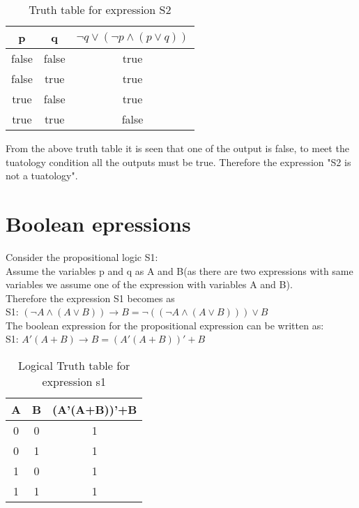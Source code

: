 \documentclass[journal,12pt,twocolumn]{IEEEtran}
\begin{document}
\begin{table}[h]
  \centering
  \caption{Truth table for expression S2}
   \begin{tabular}{|c|c|c|}
\hline
p & q & $\neg{q} \lor (\neg{p} \land ({p}\lor {q}))$\\
\hline
false & false & true\\
\hline
false & true & true\\
\hline                   
true & false & true\\
\hline
true & true & false\\   
\hline
\end{tabular}
\end{table}
    From the above truth table it is seen that one of the output is false, to meet the tuatology condition all the outputs must be true. Therefore the expression "S2 is not a tuatology".\\
\section{Boolean epressions}
 Consider the propositional logic S1:\\
  Assume the variables p and q as A and B(as there are two expressions with same variables we assume one of the expression with variables A and B).\\
Therefore the expression S1 becomes as\\
S1: $(\neg{A} \land({A}\lor{B})) \longrightarrow B = \neg((\neg{A} \land({A}\lor{B})))\lor{B}$\\
The boolean expression for the propositional expression can be written as:\\
S1: $A'(A+B) \longrightarrow B = (A'(A+B))'+B$
\begin{table}[h]
	\centering
	\caption{Logical Truth table for expression s1}
	\begin{tabular}{|c|c|c|}
	\hline
	A & B & (A'(A+B))'+B\\
	\hline
	0 & 0 & 1\\
	\hline
	0 & 1 & 1\\
	\hline
	1 & 0 & 1\\
	\hline
	1 & 1 & 1\\
	\hline
  \end{tabular}
\end{table}
\end{document}

